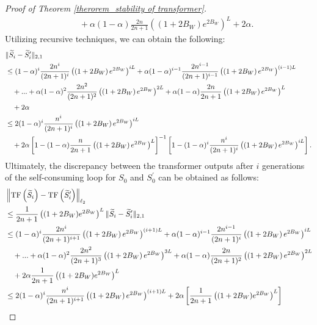 \begin{proof}[Proof of Theorem \ref{therorem_stability of transformer}]
\begin{align}
    &\quad +\alpha (1-\alpha)\frac{2n}{2 n+1}\left(\left(1+2 B_W\right) e^{2 B_W}\right)^L+2\alpha.
\end{align}
Utilizing recursive techniques, we can obtain the following:
\begin{align}
    &\|\widetilde{S}_i-\widetilde{S}_i'\|_{2,1}\notag \\
     &\leq (1-\alpha)^i \frac{2 n^i}{(2 n+1)^i}\left(\left(1+2 B_W\right) e^{2 B_W}\right)^{i L}+\alpha(1-\alpha)^{i-1} \frac{2 n^{i-1}}{(2 n+1)^{i-1}}\left(\left(1+2 B_W\right) e^{2 B_W}\right)^{(i-1)L} \notag\\
    &\quad+...+\alpha(1-\alpha)^{2} \frac{2 n^{2}}{(2 n+1)^{2}}\left(\left(1+2 B_W\right) e^{2 B_W}\right)^{2L} +\alpha (1-\alpha)\frac{2n}{2 n+1}\left(\left(1+2 B_W\right) e^{2 B_W}\right)^L\notag \\
    &\quad+2\alpha \notag \\
    &\leq 2(1-\alpha)^i \frac{ n^i}{(2 n+1)^i}\left(\left(1+2 B_W\right) e^{2 B_W}\right)^{i L}\notag \\
    &\quad+2\alpha\left[1-(1-\alpha) \frac{ n}{2 n+1}\left(\left(1+2 B_W\right) e^{2 B_W}\right)^L\right]^{-1}\left[1-(1-\alpha)^i \frac{ n^i}{(2 n+1)^i}\left(\left(1+2 B_W\right) e^{2 B_W}\right)^{i L}\right].
\end{align}
Ultimately, the discrepancy between the transformer outputs after $i$ generations of the self-consuming loop for $S_0$ and $S_0^{\prime}$ can be obtained as follows:
\begin{align}
    &\left\|\mathrm{TF}\left(\widetilde{S}_i\right)-\mathrm{TF}\left(\widetilde{S}_i'\right)\right\|_{\ell_2} \notag\\
    &\leq \frac{1}{2 n+1}\left((1+2B_W) e^{2B_W}\right)^L \|\widetilde{S}_i-\widetilde{S}_i'\|_{2,1} \notag \\
   &\leq (1-\alpha)^i \frac{2 n^i}{(2 n+1)^{i+1}}\left(\left(1+2 B_W\right) e^{2 B_W}\right)^{(i+1) L}+\alpha(1-\alpha)^{i-1} \frac{2 n^{i-1}}{(2 n+1)^{i}}\left(\left(1+2 B_W\right) e^{2 B_W}\right)^{iL} \notag\\
    &\quad+...+\alpha(1-\alpha)^{2} \frac{2 n^{2}}{(2 n+1)^{3}}\left(\left(1+2 B_W\right) e^{2 B_W}\right)^{3L} +\alpha (1-\alpha)\frac{2n}{(2 n+1)^2}\left(\left(1+2 B_W\right) e^{2 B_W}\right)^{2L}\notag \\
    &\quad+2\alpha \frac{1}{2 n+1}\left((1+2B_W) e^{2B_W}\right)^L\notag \\
    &\leq 2(1-\alpha)^i \frac{ n^i}{(2 n+1)^{i+1}}\left(\left(1+2 B_W\right) e^{2 B_W}\right)^{(i+1) L}+2\alpha\left[\frac{1}{2 n+1}\left((1+2B_W) e^{2B_W}\right)^L\right] \notag \\

\end{align}
\end{proof}
